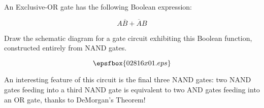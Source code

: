

An Exclusive-OR gate has the following Boolean expression:

$$A\overline{B} + \overline{A}B$$

Draw the schematic diagram for a gate circuit exhibiting this Boolean function, constructed entirely from NAND gates.







$$\epsfbox{02816x01.eps}$$







An interesting feature of this circuit is the final three NAND gates: two NAND gates feeding into a third NAND gate is equivalent to two AND gates feeding into an OR gate, thanks to DeMorgan's Theorem!




